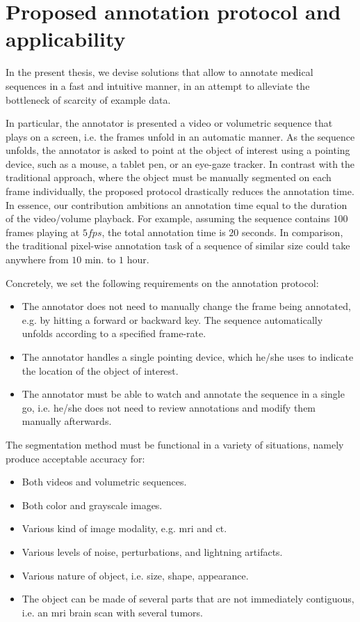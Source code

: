\section{Proposed annotation protocol and applicability}

In the present thesis, we devise solutions that allow to annotate medical sequences in a fast and intuitive manner, in an attempt to alleviate the bottleneck of scarcity of example data.

In particular, the annotator is presented a video or volumetric sequence that plays on a screen, i.e. the frames unfold in an automatic manner.
As the sequence unfolds, the annotator is asked to point at the object of interest using a pointing device, such as a mouse, a tablet pen, or an eye-gaze tracker.
In contrast with the traditional approach, where the object must be manually segmented on each frame individually, the proposed protocol drastically reduces the annotation time.
In essence, our contribution ambitions an annotation time equal to the duration of the video/volume playback.
For example, assuming the sequence contains $100$ frames playing at $5fps$, the total annotation time is $20$ seconds.
In comparison, the traditional pixel-wise annotation task of a sequence of similar size could take anywhere from $10$ min. to $1$ hour.

Concretely, we set the following requirements on the annotation protocol:
\begin{itemize}
  \item The annotator does not need to manually change the frame being annotated, e.g. by hitting a forward or backward key. The sequence automatically unfolds according to a specified frame-rate.
  \item The annotator handles a single pointing device, which he/she uses to indicate the location of the object of interest.
  \item The annotator must be able to watch and annotate the sequence in a single go, i.e. he/she does not need to review annotations and modify them manually afterwards.
\end{itemize}

The segmentation method must be functional in a variety of situations, namely produce acceptable accuracy for:
\begin{itemize}
  \item Both videos and volumetric sequences.
  \item Both color and grayscale images.
  \item Various kind of image modality, e.g. \gls{mri} and \gls{ct}.
  \item Various levels of noise, perturbations, and lightning artifacts.
  \item Various nature of object, i.e. size, shape, appearance.
  \item The object can be made of several parts that are not immediately contiguous, i.e. an \gls{mri} brain scan with several tumors.
\end{itemize}

